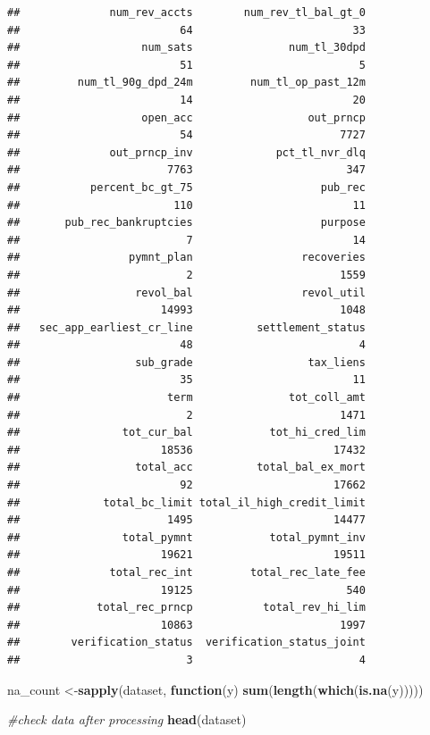 \documentclass[]{article}
\newenvironment{Shaded}{\begin{snugshade}}{\end{snugshade}}
\newcommand{\CommentTok}[1]{\textcolor[rgb]{0.56,0.35,0.01}{\textit{#1}}}
\newcommand{\ControlFlowTok}[1]{\textcolor[rgb]{0.13,0.29,0.53}{\textbf{#1}}}
\newcommand{\KeywordTok}[1]{\textcolor[rgb]{0.13,0.29,0.53}{\textbf{#1}}}
\newcommand{\NormalTok}[1]{#1}
\begin{document}
\begin{verbatim}
##              num_rev_accts        num_rev_tl_bal_gt_0 
##                         64                         33 
##                   num_sats               num_tl_30dpd 
##                         51                          5 
##         num_tl_90g_dpd_24m         num_tl_op_past_12m 
##                         14                         20 
##                   open_acc                  out_prncp 
##                         54                       7727 
##              out_prncp_inv             pct_tl_nvr_dlq 
##                       7763                        347 
##           percent_bc_gt_75                    pub_rec 
##                        110                         11 
##       pub_rec_bankruptcies                    purpose 
##                          7                         14 
##                 pymnt_plan                 recoveries 
##                          2                       1559 
##                  revol_bal                 revol_util 
##                      14993                       1048 
##   sec_app_earliest_cr_line          settlement_status 
##                         48                          4 
##                  sub_grade                  tax_liens 
##                         35                         11 
##                       term               tot_coll_amt 
##                          2                       1471 
##                tot_cur_bal            tot_hi_cred_lim 
##                      18536                      17432 
##                  total_acc          total_bal_ex_mort 
##                         92                      17662 
##             total_bc_limit total_il_high_credit_limit 
##                       1495                      14477 
##                total_pymnt            total_pymnt_inv 
##                      19621                      19511 
##              total_rec_int         total_rec_late_fee 
##                      19125                        540 
##            total_rec_prncp           total_rev_hi_lim 
##                      10863                       1997 
##        verification_status  verification_status_joint 
##                          3                          4
\end{verbatim}

\begin{Shaded}
\begin{Highlighting}[]
\NormalTok{  na_count <-}\KeywordTok{sapply}\NormalTok{(dataset, }\ControlFlowTok{function}\NormalTok{(y) }\KeywordTok{sum}\NormalTok{(}\KeywordTok{length}\NormalTok{(}\KeywordTok{which}\NormalTok{(}\KeywordTok{is.na}\NormalTok{(y)))))}
  
  \CommentTok{#check data after processing}
  \KeywordTok{head}\NormalTok{(dataset)}
\end{Highlighting}
\end{Shaded}
\end{document}
